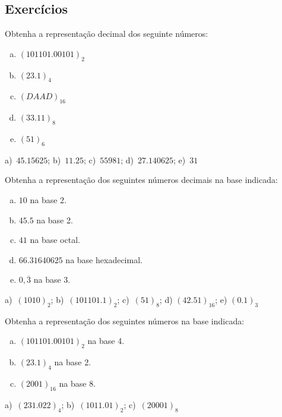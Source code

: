 \subsection{Exercícios}

\begin{exer}
  Obtenha a representação decimal dos seguinte números:
  \begin{enumerate}[a)]
  \item $(101101.00101)_2$
  \item $(23.1)_4$
  \item $(DAAD)_{16}$
  \item $(33.11)_8$
  \item $(51)_6$
  \end{enumerate}
\end{exer}
\begin{resp}
  a)~$45.15625$; b)~$11.25$; c)~$55981$; d)~$27.140625$; e)~$31$
\end{resp}

\begin{exer}
  Obtenha a representação dos seguintes números decimais na base indicada:
  \begin{enumerate}[a)]
  \item $10$ na base 2.
  \item $45.5$ na base 2.
  \item $41$ na base octal.
  \item $66.31640625$ na base hexadecimal.
  \item $0,\overline{3}$ na base 3.
  \end{enumerate}
\end{exer}
\begin{resp}
  a)~$(1010)_2$; b)~$(101101.1)_2$; c)~$(51)_8$; d) $(42.51)_{16}$; e) $(0.1)_3$
\end{resp}

\begin{exer}
  Obtenha a representação dos seguintes números na base indicada:
  \begin{enumerate}[a)]
  \item $(101101.00101)_2$ na base 4.
  \item $(23.1)_4$ na base 2.
  \item $(2001)_{16}$ na base 8.
  \end{enumerate}
\end{exer}
\begin{resp}
   a)~$(231.022)_4$; b)~$(1011.01)_2$; c)~$(20001)_8$
\end{resp}

